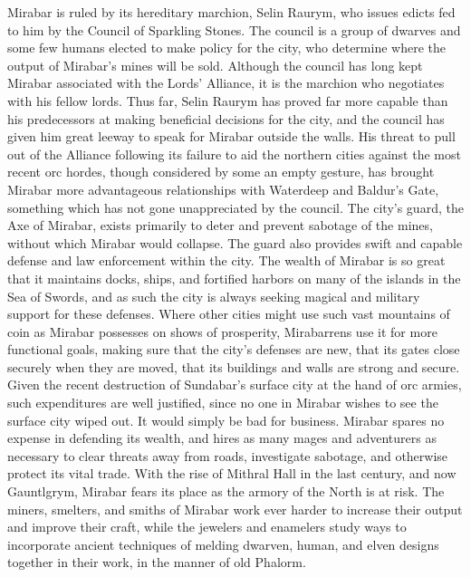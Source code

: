 \documentclass[10pt,a4paper,twoside,twocolumn,openany,bg=print,nodeprecatedcode]{dndbook}
\begin{document}
Mirabar is ruled by its hereditary marchion, Selin Raurym, who issues edicts fed to him by the Council of Sparkling Stones. The council is a group of dwarves and some few humans elected to make policy for the city, who determine where the output of Mirabar's mines will be sold. Although the council has long kept Mirabar associated with the Lords' Alliance, it is the marchion who negotiates with his fellow lords. Thus far, Selin Raurym has proved far more capable than his predecessors at making beneficial decisions for the city, and the council has given him great leeway to speak for Mirabar outside the walls. His threat to pull out of the Alliance following its failure to aid the northern cities against the most recent orc hordes, though considered by some an empty gesture, has brought Mirabar more advantageous relationships with Waterdeep and Baldur's Gate, something which has not gone unappreciated by the council.
The city's guard, the Axe of Mirabar, exists primarily to deter and prevent sabotage of the mines, without which Mirabar would collapse. The guard also provides swift and capable defense and law enforcement within the city. The wealth of Mirabar is so great that it maintains docks, ships, and fortified harbors on many of the islands in the Sea of Swords, and as such the city is always seeking magical and military support for these defenses. Where other cities might use such vast mountains of coin as Mirabar possesses on shows of prosperity, Mirabarrens use it for more functional goals, making sure that the city's defenses are new, that its gates close securely when they are moved, that its buildings and walls are strong and secure. Given the recent destruction of Sundabar's surface city at the hand of orc armies, such expenditures are well justified, since no one in Mirabar wishes to see the surface city wiped out. It would simply be bad for business. Mirabar spares no expense in defending its wealth, and hires as many mages and adventurers as necessary to clear threats away from roads, investigate sabotage, and otherwise protect its vital trade.
With the rise of Mithral Hall in the last century, and now Gauntlgrym, Mirabar fears its place as the armory of the North is at risk. The miners, smelters, and smiths of Mirabar work ever harder to increase their output and improve their craft, while the jewelers and enamelers study ways to incorporate ancient techniques of melding dwarven, human, and elven designs together in their work, in the manner of old Phalorm.
\end{document}
